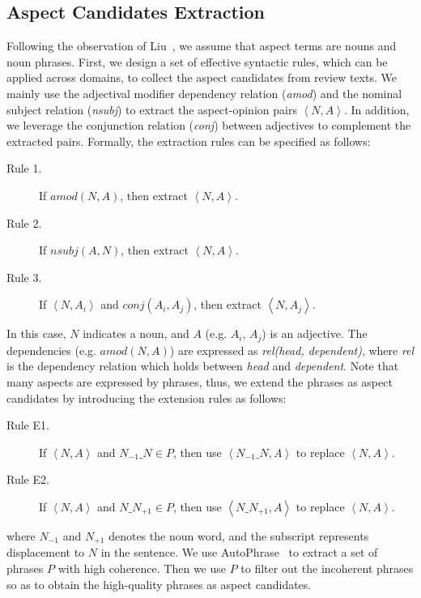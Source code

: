 \subsection{Aspect Candidates Extraction}
\label{sec:candidate}
Following the observation of Liu~, 
we assume that aspect terms are nouns and noun phrases.  
First, we design a set of effective syntactic rules, which can be applied across domains, to collect the aspect candidates from review texts.
We mainly use the adjectival modifier dependency relation (\emph{amod})
and the nominal subject relation (\emph{nsubj})
to extract the aspect-opinion pairs $\left\langle N, A \right\rangle$.
In addition, we leverage the conjunction relation (\emph{conj}) between 
adjectives to complement the extracted pairs. 
Formally, the extraction rules can be specified as follows:
\begin{description}
	\item[Rule 1.] If $amod(N, A)$, then extract $\left\langle N, A \right\rangle$.
	\item[Rule 2.] If $nsubj(A, N)$, then extract $\left\langle N, A \right\rangle$.
	\item[Rule 3.] If $\left\langle N, A_i \right\rangle$ and $conj(A_i, A_j)$, then extract $\left\langle N, A_j \right\rangle$.
\end{description}
In this case, $N$ indicates a noun, and $A$ (e.g. $A_i$, $A_j$) is an adjective. The dependencies (e.g. $amod(N, A)$) are expressed as \emph{rel(head, dependent)}, where \emph{rel} is the dependency relation which holds between \emph{head} and \emph{dependent}.
Note that many aspects are expressed by phrases, thus,
we extend the phrases as aspect candidates by introducing the extension rules as follows:
\begin{description}
	\item[Rule E1.] If $\left\langle N, A \right\rangle$ and $N_{-1}\_N\in P$, then use $\left\langle N_{-1}\_N, A \right\rangle$ to replace $\left\langle N, A \right\rangle$.
	\item[Rule E2.] If $\left\langle N, A \right\rangle$ and $N\_N_{+1}\in P$, then use $\left\langle N\_N_{+1}, A \right\rangle$ to replace $\left\langle N, A \right\rangle$.
\end{description}
where $N_{-1}$ and $N_{+1}$ denotes the noun word,
and the subscript represents displacement to $N$ in the 
sentence. 
We use AutoPhrase~\cite{liu2017phrase} to extract a set of
phrases $P$ with high coherence.
Then we use $P$ to filter
out the incoherent phrases so as to obtain the high-quality phrases as aspect candidates.
